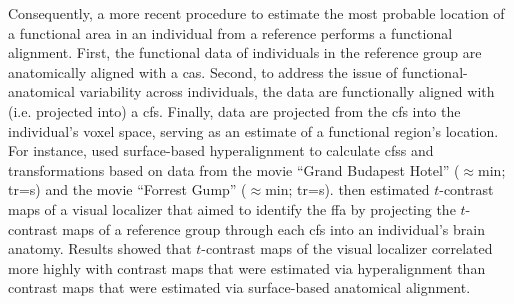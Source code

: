 Consequently, a more recent procedure \citep[e.g.,][]{jiahui2020predicting,
guntupalli2016model, haxby2011common} to estimate the most probable location of
a functional area in an individual from a reference performs a functional
alignment.
First, the functional data of individuals in the reference group are
anatomically aligned with a \ac{cas}.
%
Second, to address the issue of functional-anatomical variability across
individuals, the data are functionally aligned with (i.e. projected into) a
\ac{cfs}.
%
Finally, data are projected from the \ac{cfs} into the individual's
voxel space, serving as an estimate of a functional region's location.
For instance, \citet{jiahui2020predicting} used surface-based hyperalignment to
calculate \acp{cfs} and transformations based on data from
%
the movie ``Grand Budapest Hotel'' ($\approx$\unit[50]{min};
\ac{tr}=\unit[1]{s}) and
%
the movie ``Forrest Gump'' ($\approx$\unit[120]{min}; \ac{tr}=\unit[2]{s}).
%
\citet{jiahui2020predicting} then estimated $t$-contrast maps of a visual
localizer that aimed to identify the \ac{ffa} by projecting the $t$-contrast
maps of a reference group through each \ac{cfs} into an individual's brain
anatomy.
%
Results showed that $t$-contrast maps of the visual localizer correlated more
highly with contrast maps that were estimated via hyperalignment than contrast
maps that were estimated via surface-based anatomical alignment.





